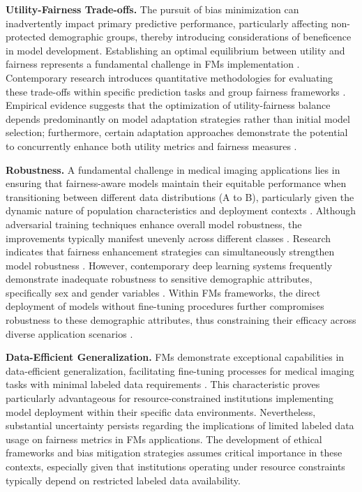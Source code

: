 \textbf{Utility-Fairness Trade-offs.} The pursuit of bias minimization can inadvertently impact primary predictive performance, particularly affecting non-protected demographic groups, thereby introducing considerations of beneficence in model development. Establishing an optimal equilibrium between utility and fairness represents a fundamental challenge in FMs implementation \cite{barocas_fairness_2023}. Contemporary research introduces quantitative methodologies for evaluating these trade-offs within specific prediction tasks and group fairness frameworks \cite{dehdashtian_utility-fairness_2024}. Empirical evidence suggests that the optimization of utility-fairness balance depends predominantly on model adaptation strategies rather than initial model selection; furthermore, certain adaptation approaches demonstrate the potential to concurrently enhance both utility metrics and fairness measures \cite{jin_fairmedfm_2024}.

\textbf{Robustness.} A fundamental challenge in medical imaging applications lies in ensuring that fairness-aware models maintain their equitable performance when transitioning between different data distributions (A to B), particularly given the dynamic nature of population characteristics and deployment contexts \cite{schrouff_diagnosing_2023}. Although adversarial training techniques enhance overall model robustness, the improvements typically manifest unevenly across different classes \cite{xu_be_2021, ma_tradeoff_2022}. Research indicates that fairness enhancement strategies can simultaneously strengthen model robustness \cite{mou_fairness_2024}. However, contemporary deep learning systems frequently demonstrate inadequate robustness to sensitive demographic attributes, specifically sex and gender variables \cite{zong_medfair_2023}. Within FMs frameworks, the direct deployment of models without fine-tuning procedures further compromises robustness to these demographic attributes, thus constraining their efficacy across diverse application scenarios \cite{queiroz_using_2025}.


\textbf{Data-Efficient Generalization.} FMs demonstrate exceptional capabilities in data-efficient generalization, facilitating fine-tuning processes for medical imaging tasks with minimal labeled data requirements \cite{azizi_robust_2023}. This characteristic proves particularly advantageous for resource-constrained institutions implementing model deployment within their specific data environments. Nevertheless, substantial uncertainty persists regarding the implications of limited labeled data usage on fairness metrics in FMs applications. The development of ethical frameworks and bias mitigation strategies assumes critical importance in these contexts, especially given that institutions operating under resource constraints typically depend on restricted labeled data availability.

